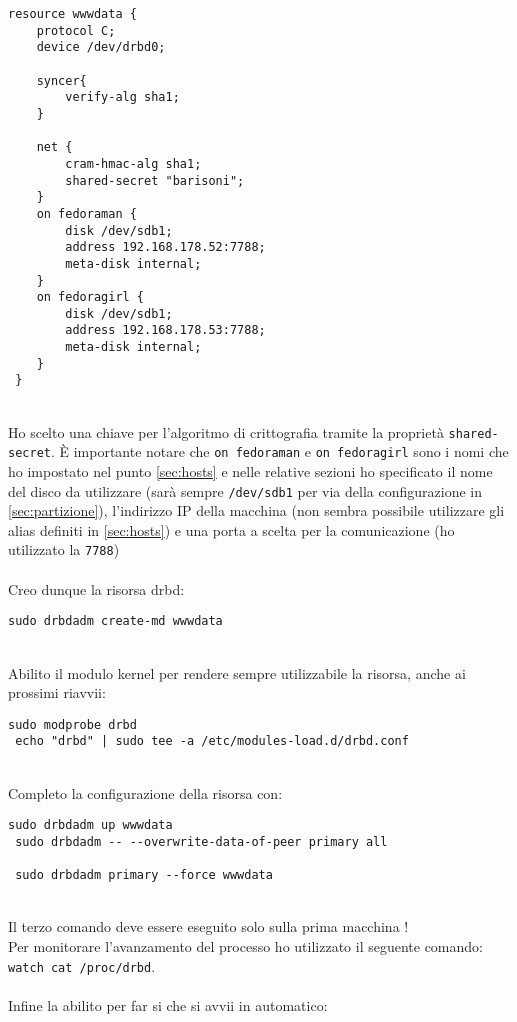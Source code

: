 \begin{lstlisting}[style=cmd]
 resource wwwdata {
    protocol C;
    device /dev/drbd0;

    syncer{
        verify-alg sha1;
    }

    net {
        cram-hmac-alg sha1;
        shared-secret "barisoni";
    }
    on fedoraman {
        disk /dev/sdb1;
        address 192.168.178.52:7788;
        meta-disk internal;
    }
    on fedoragirl {
        disk /dev/sdb1;
        address 192.168.178.53:7788;
        meta-disk internal;
    }
 }
\end{lstlisting}
\ \\
Ho scelto una chiave per l'algoritmo di crittografia tramite la propriet\`{a} \lstinline[style=cmd]|shared-secret|. \`{E} importante notare che \lstinline[style=cmd]|on fedoraman| e \lstinline[style=cmd]|on fedoragirl| sono i nomi che ho impostato nel punto \autoref{sec:hosts} e nelle relative sezioni ho specificato il nome del disco da utilizzare (sar\`{a} sempre \lstinline[style=cmd]|/dev/sdb1| per via della configurazione in \autoref{sec:partizione}), l'indirizzo IP della macchina (non sembra possibile utilizzare gli alias definiti in \autoref{sec:hosts}) e una porta a scelta per la comunicazione (ho utilizzato la \lstinline[style=cmd]|7788|)\ \\
\ \\
Creo dunque la risorsa drbd:

\begin{lstlisting}[style=cmd]
 sudo drbdadm create-md wwwdata
\end{lstlisting}
\ \\
Abilito il modulo kernel per rendere sempre utilizzabile la risorsa, anche ai prossimi riavvii:

\begin{lstlisting}[style=cmd]
 sudo modprobe drbd
 echo "drbd" | sudo tee -a /etc/modules-load.d/drbd.conf
\end{lstlisting}
\ \\
Completo la configurazione della risorsa con:

\begin{lstlisting}[style=cmd]
 sudo drbdadm up wwwdata
 sudo drbdadm -- --overwrite-data-of-peer primary all
 
 sudo drbdadm primary --force wwwdata
\end{lstlisting}
\ \\
Il terzo comando deve essere eseguito solo sulla prima macchina !\\
Per monitorare l'avanzamento del processo ho utilizzato il seguente comando: \lstinline[style=cmd]|watch cat /proc/drbd|.\\
\ \\
Infine la abilito per far si che si avvii in automatico:

